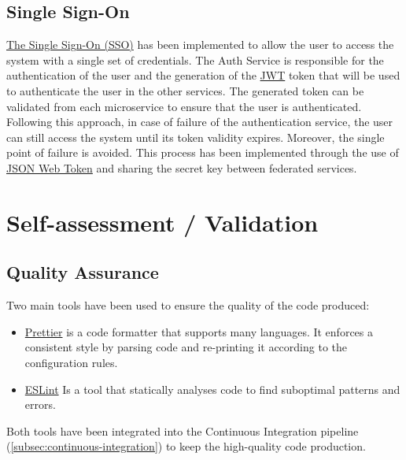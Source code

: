 \documentclass{scrartcl}
\begin{document}
    \subsection{Single Sign-On}
    \href{https://en.wikipedia.org/wiki/Single_sign-on}{The Single Sign-On (SSO)} has been implemented to allow the user to access the system with a single set of credentials.
    The Auth Service is responsible for the authentication of the user and the generation of the \href{https://jwt.io/}{JWT} token that will be used to authenticate the user in the other services.
    The generated token can be validated from each microservice to ensure that the user is authenticated.
    Following this approach, in case of failure of the authentication service, the user can still access the system until its token validity expires.
    Moreover, the single point of failure is avoided.
    This process has been implemented through the use of \href{https://jwt.io/}{JSON Web Token} and sharing the secret key between federated services.

    

    \section{Self-assessment / Validation}

    \subsection{Quality Assurance}\label{subsec:quality-assurance}

    Two main tools have been used to ensure the quality of the code produced:

    \begin{itemize}
        \item \href{https://prettier.io/}{Prettier} is a code formatter that supports many languages.
        It enforces a consistent style by parsing code and re-printing it according to the configuration rules.
        \item \href{https://eslint.org/}{ESLint} Is a tool that statically analyses code to find suboptimal patterns and errors.
    \end{itemize}

    Both tools have been integrated into the Continuous Integration pipeline (\cref{subsec:continuous-integration}) to keep the high-quality code production.
\end{document}
